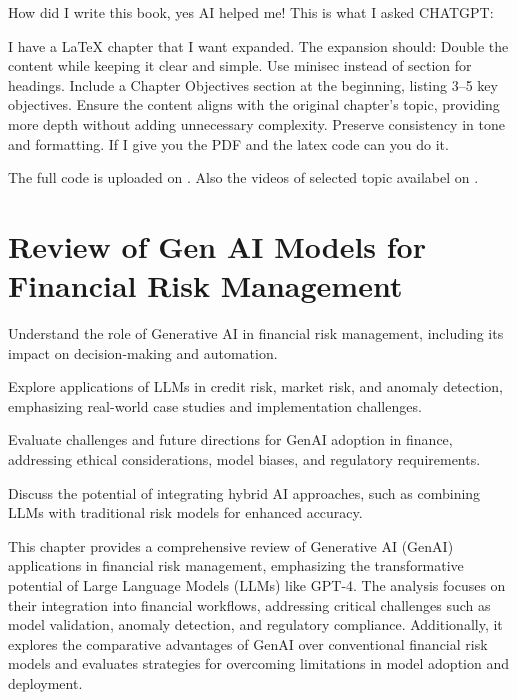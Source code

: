 \documentclass[a4paper,headinclude=on,footinclude=on,12pt,oneside]{scrbook}
\begin{document}
	How did I write this book, yes AI helped me!
	This is what I asked CHATGPT:
	
	I have a LaTeX chapter that I want expanded. The expansion should:
	Double the content while keeping it clear and simple.
	Use minisec instead of section for headings.
	Include a Chapter Objectives section at the beginning, listing 3–5 key objectives.
	Ensure the content aligns with the original chapter's topic, providing more depth without adding unnecessary complexity.
	Preserve consistency in tone and formatting.
	If I give you the PDF and the latex code can you do it.
	
	
	The full code is uploaded on \cite{JoshiGit2025}.
	Also the videos of selected topic availabel on \cite{JoshiYouTube2025}.
	
	
	
	
	
	
	
	\chapter{Review of Gen AI Models for Financial Risk Management}
	
	\begin{arrows}
		\item Understand the role of Generative AI in financial risk management, including its impact on decision-making and automation.
		\item Explore applications of LLMs in credit risk, market risk, and anomaly detection, emphasizing real-world case studies and implementation challenges.
		\item Evaluate challenges and future directions for GenAI adoption in finance, addressing ethical considerations, model biases, and regulatory requirements.
		\item Discuss the potential of integrating hybrid AI approaches, such as combining LLMs with traditional risk models for enhanced accuracy.
	\end{arrows}
	
	This chapter provides a comprehensive review of Generative AI (GenAI) applications in financial risk management, emphasizing the transformative potential of Large Language Models (LLMs) like GPT-4. The analysis focuses on their integration into financial workflows, addressing critical challenges such as model validation, anomaly detection, and regulatory compliance. Additionally, it explores the comparative advantages of GenAI over conventional financial risk models and evaluates strategies for overcoming limitations in model adoption and deployment.
	
\end{document}
